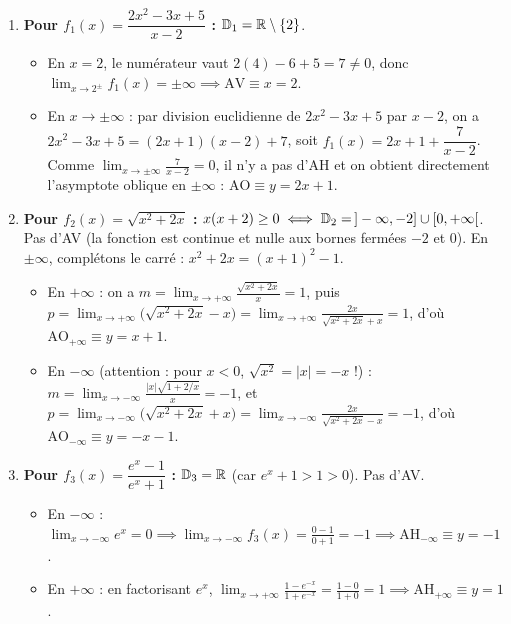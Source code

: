 \begin{enumerate}[label=(\alph*)]
    \item \textbf{Pour $f_1(x) = \dfrac{2x^2 - 3x + 5}{x - 2}$ :} $\mathbb{D}_1 = \mathbb{R} \setminus \{2\}$.
    \begin{itemize}
        \item En $x = 2$, le numérateur vaut $2(4) - 6 + 5 = 7 \neq 0$, donc $\lim_{x \to 2^\pm} f_1(x) = \pm\infty \implies \boxed{\text{AV} \equiv x = 2}$.
        \item En $x \to \pm\infty$ : par division euclidienne de $2x^2 - 3x + 5$ par $x - 2$, on a $2x^2 - 3x + 5 = (2x + 1)(x - 2) + 7$, soit $f_1(x) = 2x + 1 + \dfrac{7}{x - 2}$. Comme $\lim_{x \to \pm\infty} \frac{7}{x-2} = 0$, il n'y a pas d'AH et on obtient directement l'asymptote oblique en $\pm\infty$ : $\boxed{\text{AO} \equiv y = 2x + 1}$.
    \end{itemize}
    \item \textbf{Pour $f_2(x) = \sqrt{x^2 + 2x}$ :} $x(x+2) \ge 0 \iff \mathbb{D}_2 = \,]-\infty, -2] \cup [0, +\infty[$. Pas d'AV (la fonction est continue et nulle aux bornes fermées $-2$ et $0$). En $\pm\infty$, complétons le carré : $x^2 + 2x = (x+1)^2 - 1$.
    \begin{itemize}
        \item En $+\infty$ : on a $m = \lim_{x \to +\infty} \frac{\sqrt{x^2+2x}}{x} = 1$, puis $p = \lim_{x \to +\infty} \bigl(\sqrt{x^2+2x} - x\bigr) = \lim_{x \to +\infty} \frac{2x}{\sqrt{x^2+2x}+x} = 1$, d'où $\boxed{\text{AO}_{+\infty} \equiv y = x + 1}$.
        \item En $-\infty$ (attention : pour $x < 0$, $\sqrt{x^2} = |x| = -x$ !) : $m = \lim_{x \to -\infty} \frac{|x|\sqrt{1+2/x}}{x} = -1$, et $p = \lim_{x \to -\infty} \bigl(\sqrt{x^2+2x} + x\bigr) = \lim_{x \to -\infty} \frac{2x}{\sqrt{x^2+2x}-x} = -1$, d'où $\boxed{\text{AO}_{-\infty} \equiv y = -x - 1}$.
    \end{itemize}
    \item \textbf{Pour $f_3(x) = \dfrac{e^x - 1}{e^x + 1}$ :} $\mathbb{D}_3 = \mathbb{R}$ (car $e^x + 1 > 1 > 0$). Pas d'AV.
    \begin{itemize}
        \item En $-\infty$ : $\lim_{x \to -\infty} e^x = 0 \implies \lim_{x \to -\infty} f_3(x) = \frac{0 - 1}{0 + 1} = -1 \implies \boxed{\text{AH}_{-\infty} \equiv y = -1}$.
        \item En $+\infty$ : en factorisant $e^x$, $\lim_{x \to +\infty} \frac{1 - e^{-x}}{1 + e^{-x}} = \frac{1 - 0}{1 + 0} = 1 \implies \boxed{\text{AH}_{+\infty} \equiv y = 1}$.
    \end{itemize}
\end{enumerate}

